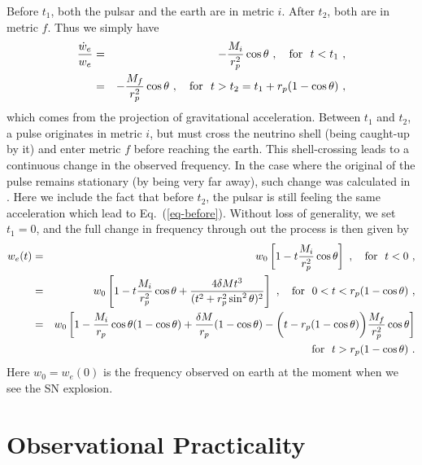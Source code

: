 \documentclass[aps,showpacs,onecolumn,floats,prd,superscriptaddress,nofootinbib]{revtex4}
\begin{document}
Before $t_1$, both the pulsar and the earth are in metric $i$. After $t_2$, both are in metric $f$. Thus we simply have
\begin{eqnarray}
\frac{\dot{w}_e}{w_e} &=& -\frac{M_i}{r_p^2}\cos\theta~, \ \ \ {\rm for} \ \ t<t_1~,
\label{eq-before} \\
&=& -\frac{M_f}{r_p^2}\cos\theta~, \ \ \ {\rm for} \ \ t>t_2 = t_1 + r_p(1-\cos\theta)~,
\end{eqnarray}
which comes from the projection of gravitational acceleration. Between $t_1$ and $t_2$, a pulse originates in metric $i$, but must cross the neutrino shell (being caught-up by it) and enter metric $f$ before reaching the earth. This shell-crossing leads to a continuous change in the observed frequency. In the case where the original of the pulse remains stationary (by being very far away), such change was calculated in \cite{OluPie13}. Here we include the fact that before $t_2$, the pulsar is still feeling the same acceleration which lead to Eq.~(\ref{eq-before}). Without loss of generality, we set $t_1=0$, and the full change in frequency through out the process is then given by
\begin{eqnarray}
w_e(t) &=& w_0 \left[ 1 -  t\frac{M_i}{r_p^2}\cos\theta \right]~, 
\ \ \ {\rm for} \ \ t < 0~, \label{eq-beforeW}  \\
&=& w_0
\left[ 1 -  t\frac{M_i}{r_p^2}\cos\theta + \frac{4\delta M t^3}{(t^2 + r_p^2\sin^2\theta)^2} \right]~, 
\ \ \ {\rm for} \ \ 0 < t <  r_p(1 - \cos\theta)~, \\
&=& w_0
\left[ 1-\frac{M_i}{r_p}\cos\theta(1-\cos\theta) + \frac{\delta M}{r_p}(1-\cos\theta) -  \bigg(t-r_p(1-\cos\theta)\bigg) \frac{M_f}{r_p^2}\cos\theta \right] \nonumber \\
& & {\rm for} \ \ t > r_p(1-\cos\theta)~.
\end{eqnarray}
Here $w_0 = w_e(0)$ is the frequency observed on earth at the moment when we see the SN explosion. 

\section{Observational Practicality}
\label{sec-obs}
\end{document}
